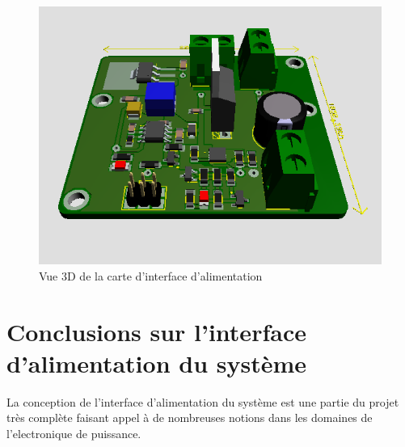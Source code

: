 \begin{landscape}
		\newpage
		
		\begin{figure}
			\begin{center}
				\includegraphics[scale=1.4]{../Illus/supply_gen_3dview.png}
			\end{center}
			\caption{Vue 3D de la carte d'interface d'alimentation}
			\label{supply_gen_3dview}
		\end{figure}
		
		\end{landscape}	 
		
		\newpage
		
	\section{Conclusions sur l'interface d'alimentation du système}
	
	La conception de l'interface d'alimentation du système est une
	partie du projet très complète faisant appel à de nombreuses notions
	dans les domaines de l'electronique de puissance.